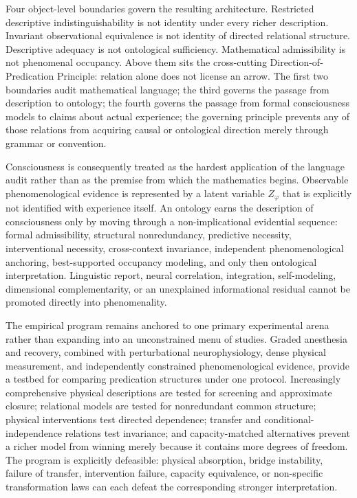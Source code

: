 Four object-level boundaries govern the resulting architecture. Restricted descriptive indistinguishability is not identity under every richer description. Invariant observational equivalence is not identity of directed relational structure. Descriptive adequacy is not ontological sufficiency. Mathematical admissibility is not phenomenal occupancy. Above them sits the cross-cutting Direction-of-Predication Principle: relation alone does not license an arrow. The first two boundaries audit mathematical language; the third governs the passage from description to ontology; the fourth governs the passage from formal consciousness models to claims about actual experience; the governing principle prevents any of those relations from acquiring causal or ontological direction merely through grammar or convention.

Consciousness is consequently treated as the hardest application of the language audit rather than as the premise from which the mathematics begins. Observable phenomenological evidence is represented by a latent variable $Z_\varphi$ that is explicitly not identified with experience itself. An ontology earns the description of consciousness only by moving through a non-implicational evidential sequence: formal admissibility, structural nonredundancy, predictive necessity, interventional necessity, cross-context invariance, independent phenomenological anchoring, best-supported occupancy modeling, and only then ontological interpretation. Linguistic report, neural correlation, integration, self-modeling, dimensional complementarity, or an unexplained informational residual cannot be promoted directly into phenomenality.

The empirical program remains anchored to one primary experimental arena rather than expanding into an unconstrained menu of studies. Graded anesthesia and recovery, combined with perturbational neurophysiology, dense physical measurement, and independently constrained phenomenological evidence, provide a testbed for comparing predication structures under one protocol. Increasingly comprehensive physical descriptions are tested for screening and approximate closure; relational models are tested for nonredundant common structure; physical interventions test directed dependence; transfer and conditional-independence relations test invariance; and capacity-matched alternatives prevent a richer model from winning merely because it contains more degrees of freedom. The program is explicitly defeasible: physical absorption, bridge instability, failure of transfer, intervention failure, capacity equivalence, or non-specific transformation laws can each defeat the corresponding stronger interpretation.

